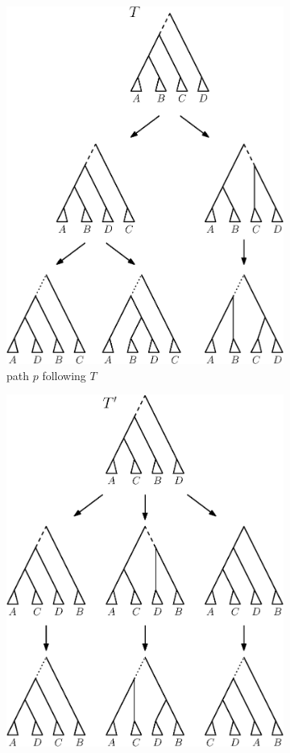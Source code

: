 \documentclass{amsart}
\begin{document}
\begin{enumerate}[{Case} (1).]
\begin{figure}[H]
	\begin{subfigure}[b]{.45\textwidth}
		\centering
		\includegraphics[width=0.9\linewidth]{thm_fp_nni2a.eps}
		\vspace{12pt}
		\caption{path $p$ following $T$}
		\label{fig:thm_fp_nni2a}
	\end{subfigure}
	\begin{subfigure}[b]{.45\textwidth}
		\centering
		\includegraphics[width=0.9\linewidth]{thm_fp_nni2b.eps}

\end{subfigure}
\end{figure}
\end{enumerate}
\end{document}
